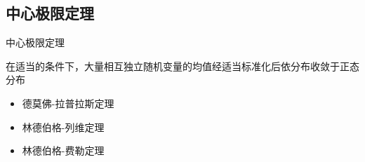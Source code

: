\documentclass[14pt,hyperref={CJKbookmarks=true}]{beamer}
\begin{document}
\subsection{中心极限定理}
\begin{frame}{中心极限定理}
\begin{theorem}
在适当的条件下，大量相互独立随机变量的均值经适当标准化后依分布收敛于正态分布
\end{theorem}
\begin{itemize}
\item 德莫佛-拉普拉斯定理
\item 林德伯格-列维定理
\item 林德伯格-费勒定理
\end{itemize}
\end{frame}
\end{document}

